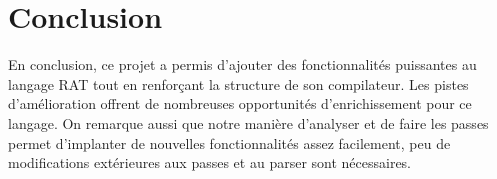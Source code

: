 \documentclass[a4paper,12pt]{article}
\begin{document}
\section{Conclusion}
En conclusion, ce projet a permis d'ajouter des fonctionnalit\'es puissantes au langage RAT tout en renfor\c{c}ant la structure de son compilateur. Les pistes d'am\'elioration offrent de nombreuses opportunit\'es d'enrichissement pour ce langage.
On remarque aussi que notre manière d'analyser et de faire les passes permet d'implanter de nouvelles fonctionnalités assez facilement, peu de modifications extérieures aux passes et au parser sont nécessaires. 
\end{document}
